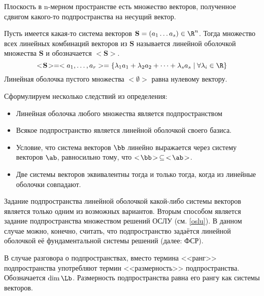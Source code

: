 \begin{df}
  Плоскость в n-мерном пространстве есть множество векторов, полученное сдвигом какого-то подпространства на несущий вектор.
\end{df}

  \begin{df}
  Пусть имеется какая-то система векторов $\mathbf S=(a_1\dots a_s)\in\R^n$. Тогда множество всех линейных комбинаций векторов из $\mathbf S$ называется линейной оболочкой множества $\mathbf S$ и обозначается $<\!\mathbf S\!>$.
  $$<\!\mathbf S\!>=<a_1,\dots, a_r>=\{ \lambda_1a_1+\lambda_2a_2+\dots+\lambda_sa_s\mid\forall \lambda_i\in\R\}$$
  Линейная оболочка пустого множества $<\!\emptyset\!>$ равна нулевому вектору.
  \end{df}
  
  Сформулируем несколько следствий из определения:
  \begin{itemize}
    \item Линейная оболочка любого множества является подпространством
    \item Всякое подпространство является линейной оболочкой своего базиса.
    \item Условие, что система векторов $\bb$ линейно выражается через систему векторов $\ab$, равносильно тому, что $<\!\bb\!>\,\subseteq\,<\!\ab\!>$.
    \item Две системы векторов эквивалентны тогда и только тогда, когда из линейные оболочки совпадают.
  \end{itemize}
  
  Задание подпространства линейной оболочкой какой-либо системы векторов является только одним из возможных вариантов. Вторым способом является задание подпространства множеством решений ОСЛУ (см. \ref{oslu}). В данном случае можно, конечно, считать, что подпространство задаётся линейной оболочкой её фундаментальной системы решений (далее: ФСР).
  
  \begin{df}
    В случае разговора о подпространствах, вместо термина <<ранг>> подпространства употребляют термин <<размерность>> подпространства. Обозначается $\dim \Lb$. Размерность подпространства равна его рангу как системы векторов.
  \end{df}
